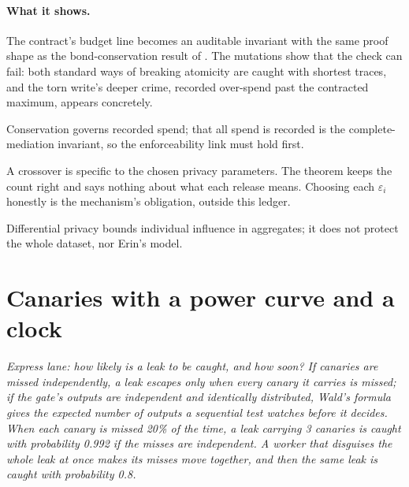 \documentclass[11pt,a4paper]{article}
\theoremstyle{definition}
\begin{document}


\paragraph{What it shows.}
The contract's budget line becomes an auditable invariant with the same proof
shape as the bond-conservation result of . The mutations show that the check can
fail: both standard ways of breaking atomicity are caught with shortest
traces, and the torn write's deeper crime, recorded over-spend past the
contracted maximum, appears concretely.

\begin{pdboundary}
\setlength{\parskip}{4pt plus 1pt}
Conservation governs recorded spend; that all spend is recorded is the
complete-mediation invariant, so the enforceability link must hold first.

A crossover is specific to the chosen privacy parameters. The theorem keeps
the count right and says nothing about what each release means. Choosing each
$\varepsilon_i$ honestly is the mechanism's obligation, outside this
ledger.

Differential privacy bounds individual influence in aggregates; it does not
protect the whole dataset, nor Erin's model.
\end{pdboundary}

\pdexercisepointer{\ref{ex:sealed-torn}}{\ref{ex:sealed-crossover}}{\pageref{ex:sealed-torn}}



\section{Canaries with a power curve and a clock}\label{sec:sealed-detection}

\noindent\emph{Express lane: how likely is a leak to be caught, and how
soon? If canaries are missed independently, a leak escapes only when every
canary it carries is missed; if the gate's outputs are independent and
identically distributed, Wald's formula gives the expected number of outputs
a sequential test watches before it decides. When each canary is missed 20\%
of the time, a leak carrying 3 canaries is caught with probability 0.992 if
the misses are independent. A worker that disguises the whole leak at once
makes its misses move together, and then the same leak is caught with
probability 0.8.}
\end{document}
